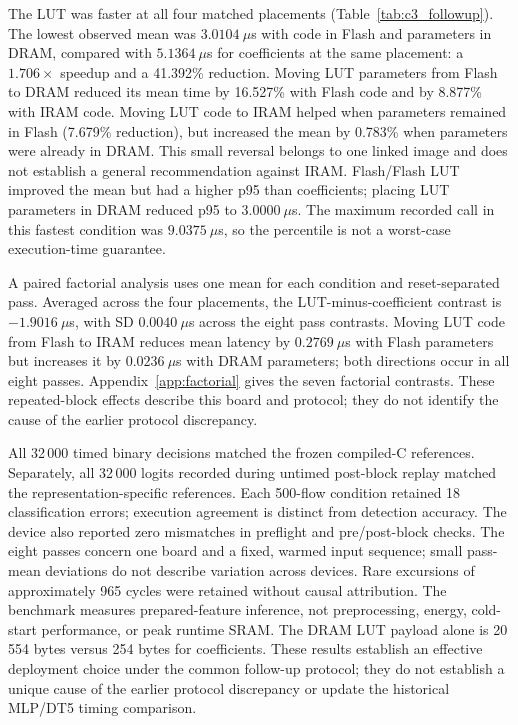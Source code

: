 The LUT was faster at all four matched placements (Table~\ref{tab:c3_followup}). The lowest observed mean was $3.0104~\mu$s with code in Flash and parameters in DRAM, compared with $5.1364~\mu$s for coefficients at the same placement: a $1.706\times$ speedup and a 41.392\% reduction. Moving LUT parameters from Flash to DRAM reduced its mean time by 16.527\% with Flash code and by 8.877\% with IRAM code. Moving LUT code to IRAM helped when parameters remained in Flash (7.679\% reduction), but increased the mean by 0.783\% when parameters were already in DRAM. This small reversal belongs to one linked image and does not establish a general recommendation against IRAM. Flash/Flash LUT improved the mean but had a higher p95 than coefficients; placing LUT parameters in DRAM reduced p95 to $3.0000~\mu$s. The maximum recorded call in this fastest condition was $9.0375~\mu$s, so the percentile is not a worst-case execution-time guarantee.

A paired factorial analysis uses one mean for each condition and reset-separated pass. Averaged across the four placements, the LUT-minus-coefficient contrast is $-1.9016~\mu$s, with SD $0.0040~\mu$s across the eight pass contrasts. Moving LUT code from Flash to IRAM reduces mean latency by $0.2769~\mu$s with Flash parameters but increases it by $0.0236~\mu$s with DRAM parameters; both directions occur in all eight passes. Appendix~\ref{app:factorial} gives the seven factorial contrasts. These repeated-block effects describe this board and protocol; they do not identify the cause of the earlier protocol discrepancy.

All 32\,000 timed binary decisions matched the frozen compiled-C references. Separately, all 32\,000 logits recorded during untimed post-block replay matched the representation-specific references. Each 500-flow condition retained 18 classification errors; execution agreement is distinct from detection accuracy. The device also reported zero mismatches in preflight and pre/post-block checks. The eight passes concern one board and a fixed, warmed input sequence; small pass-mean deviations do not describe variation across devices. Rare excursions of approximately 965 cycles were retained without causal attribution. The benchmark measures prepared-feature inference, not preprocessing, energy, cold-start performance, or peak runtime SRAM. The DRAM LUT payload alone is 20\,554 bytes versus 254 bytes for coefficients. These results establish an effective deployment choice under the common follow-up protocol; they do not establish a unique cause of the earlier protocol discrepancy or update the historical MLP/DT5 timing comparison.
